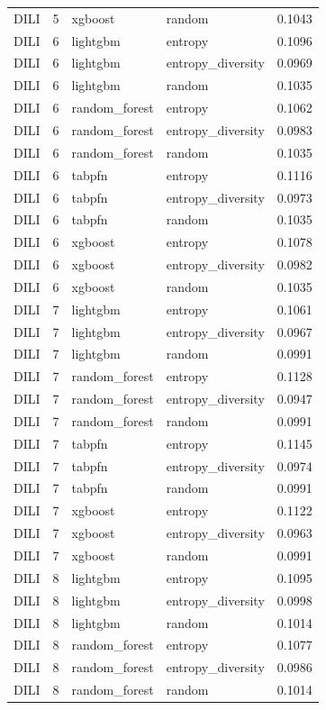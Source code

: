 \begin{tabular}{lrllr}
DILI & 5 & xgboost & random & 0.1043 \\
DILI & 6 & lightgbm & entropy & 0.1096 \\
DILI & 6 & lightgbm & entropy_diversity & 0.0969 \\
DILI & 6 & lightgbm & random & 0.1035 \\
DILI & 6 & random_forest & entropy & 0.1062 \\
DILI & 6 & random_forest & entropy_diversity & 0.0983 \\
DILI & 6 & random_forest & random & 0.1035 \\
DILI & 6 & tabpfn & entropy & 0.1116 \\
DILI & 6 & tabpfn & entropy_diversity & 0.0973 \\
DILI & 6 & tabpfn & random & 0.1035 \\
DILI & 6 & xgboost & entropy & 0.1078 \\
DILI & 6 & xgboost & entropy_diversity & 0.0982 \\
DILI & 6 & xgboost & random & 0.1035 \\
DILI & 7 & lightgbm & entropy & 0.1061 \\
DILI & 7 & lightgbm & entropy_diversity & 0.0967 \\
DILI & 7 & lightgbm & random & 0.0991 \\
DILI & 7 & random_forest & entropy & 0.1128 \\
DILI & 7 & random_forest & entropy_diversity & 0.0947 \\
DILI & 7 & random_forest & random & 0.0991 \\
DILI & 7 & tabpfn & entropy & 0.1145 \\
DILI & 7 & tabpfn & entropy_diversity & 0.0974 \\
DILI & 7 & tabpfn & random & 0.0991 \\
DILI & 7 & xgboost & entropy & 0.1122 \\
DILI & 7 & xgboost & entropy_diversity & 0.0963 \\
DILI & 7 & xgboost & random & 0.0991 \\
DILI & 8 & lightgbm & entropy & 0.1095 \\
DILI & 8 & lightgbm & entropy_diversity & 0.0998 \\
DILI & 8 & lightgbm & random & 0.1014 \\
DILI & 8 & random_forest & entropy & 0.1077 \\
DILI & 8 & random_forest & entropy_diversity & 0.0986 \\
DILI & 8 & random_forest & random & 0.1014 \\

\end{tabular}
